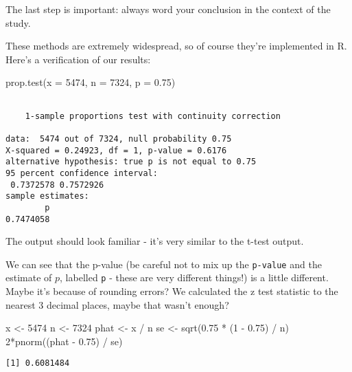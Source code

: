 \documentclass[
  letterpaper,
  DIV=11,
  numbers=noendperiod]{scrreprt}
\newenvironment{Shaded}{\begin{snugshade}}{\end{snugshade}}
\newcommand{\AttributeTok}[1]{\textcolor[rgb]{0.40,0.45,0.13}{#1}}
\newcommand{\DecValTok}[1]{\textcolor[rgb]{0.68,0.00,0.00}{#1}}
\newcommand{\FloatTok}[1]{\textcolor[rgb]{0.68,0.00,0.00}{#1}}
\newcommand{\FunctionTok}[1]{\textcolor[rgb]{0.28,0.35,0.67}{#1}}
\newcommand{\NormalTok}[1]{\textcolor[rgb]{0.00,0.23,0.31}{#1}}
\newcommand{\OtherTok}[1]{\textcolor[rgb]{0.00,0.23,0.31}{#1}}
\newcommand{\SpecialCharTok}[1]{\textcolor[rgb]{0.37,0.37,0.37}{#1}}
\begin{document}
The last step is important: always word your conclusion in the context
of the study.

These methods are extremely widespread, so of course they're implemented
in R. Here's a verification of our results:

\begin{Shaded}
\begin{Highlighting}[]
\FunctionTok{prop.test}\NormalTok{(}\AttributeTok{x =} \DecValTok{5474}\NormalTok{, }\AttributeTok{n =} \DecValTok{7324}\NormalTok{, }\AttributeTok{p =} \FloatTok{0.75}\NormalTok{)}
\end{Highlighting}
\end{Shaded}

\begin{verbatim}

    1-sample proportions test with continuity correction

data:  5474 out of 7324, null probability 0.75
X-squared = 0.24923, df = 1, p-value = 0.6176
alternative hypothesis: true p is not equal to 0.75
95 percent confidence interval:
 0.7372578 0.7572926
sample estimates:
        p 
0.7474058 
\end{verbatim}

The output should look familiar - it's very similar to the t-test
output.

We can see that the p-value (be careful not to mix up the
\texttt{p-value} and the estimate of \(p\), labelled \texttt{p} - these
are very different things!) is a little different. Maybe it's because of
rounding errors? We calculated the z test statistic to the nearest 3
decimal places, maybe that wasn't enough?

\begin{Shaded}
\begin{Highlighting}[]
\NormalTok{x }\OtherTok{\textless{}{-}} \DecValTok{5474}
\NormalTok{n }\OtherTok{\textless{}{-}} \DecValTok{7324}
\NormalTok{phat }\OtherTok{\textless{}{-}}\NormalTok{ x }\SpecialCharTok{/}\NormalTok{ n}
\NormalTok{se }\OtherTok{\textless{}{-}} \FunctionTok{sqrt}\NormalTok{(}\FloatTok{0.75} \SpecialCharTok{*}\NormalTok{ (}\DecValTok{1} \SpecialCharTok{{-}} \FloatTok{0.75}\NormalTok{) }\SpecialCharTok{/}\NormalTok{ n)}
\DecValTok{2}\SpecialCharTok{*}\FunctionTok{pnorm}\NormalTok{((phat }\SpecialCharTok{{-}} \FloatTok{0.75}\NormalTok{) }\SpecialCharTok{/}\NormalTok{ se)}
\end{Highlighting}
\end{Shaded}

\begin{verbatim}
[1] 0.6081484
\end{verbatim}
\end{document}
